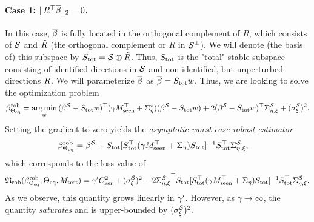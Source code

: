 \paragraph{Case 1: $\| R^\top \overline{\beta} \|_2 = 0$.}  In this case, $\overline{\beta}$ is fully located in the orthogonal complement of $R$, which consists of $\mathcal{S}$ and $\tilde{R}$ (the orthogonal complement or $R$ in $\mathcal{S}^\perp$). We will denote (the basis of) this subspace by $S_\mathrm{tot} = \mathcal{S} \oplus \tilde{R}$. Thus, $S_\mathrm{tot}$ is the "total" stable subspace consisting of identified directions in $\mathcal{S}$ and non-identified, but unperturbed directions $\tilde{R}$. We will parameterize $\overline{\beta}$ as $\overline{\beta} = S_\mathrm{tot} w$. Thus, we are looking to solve the optimization problem 
\begin{align*}
   \beta^{\mathrm{rob}}_{\Theta_{\mathrm{eq}}} =  \operatorname*{arg\,min}_{w} \, (\beta^{\mathcal{S}} - S_\mathrm{tot} w)^\top (\gamma M_{\mathrm{seen}}^\top + \Sigma^\star_{\eta}) (\beta^{\mathcal{S}} -  S_\mathrm{tot} w) + 2 (\beta^{\mathcal{S}} -  S_\mathrm{tot} w)^\top \Sigma^{\mathcal{S}}_{\eta,\xi} + ({\sigma_\xi^{\mathcal{S}}})^2.
\end{align*}
Setting the gradient to zero yields the \emph{asymptotic worst-case robust estimator} 
\begin{equation}\label{eq:apx-pi-robust-formula}
\begin{aligned}
        \beta^{\mathrm{rob}}_{\Theta_{\mathrm{eq}}} &= \beta^{\mathcal{S}} + S_\mathrm{tot} [ S_\mathrm{tot}^\top (\gamma M_{\mathrm{seen}}^\top + \Sigma_{\eta}) S_\mathrm{tot} ]^{-1} S_\mathrm{tot}^\top \Sigma^{\mathcal{S}}_{\eta,\xi},
\end{aligned}
\end{equation}
which corresponds to the loss value of 
\begin{align*}
    \mathfrak{R}_{\mathrm{rob}}(\beta^{\mathrm{rob}}_{\Theta_{\mathrm{eq}}}; \Theta_{\mathrm{eq}}, M_{\mathrm{test}}) = \gamma' C_{\mathrm{ker}}^2 +  ({\sigma_\xi^{\mathcal{S}}})^2 - 2 {\Sigma^{\mathcal{S}}_{\eta,\xi}}^\top S_\mathrm{tot} [ S_\mathrm{tot}^\top (\gamma M_{\mathrm{seen}}^\top + \Sigma_{\eta}) S_\mathrm{tot} ]^{-1} S_\mathrm{tot}^\top \Sigma^{\mathcal{S}}_{\eta,\xi}.
\end{align*}
As we observe, this quantity grows linearly in $\gamma'$. However, as $\gamma \to \infty$, the quantity \emph{saturates} and is upper-bounded by $({\sigma_\xi^{\mathcal{S}}})^2$.

